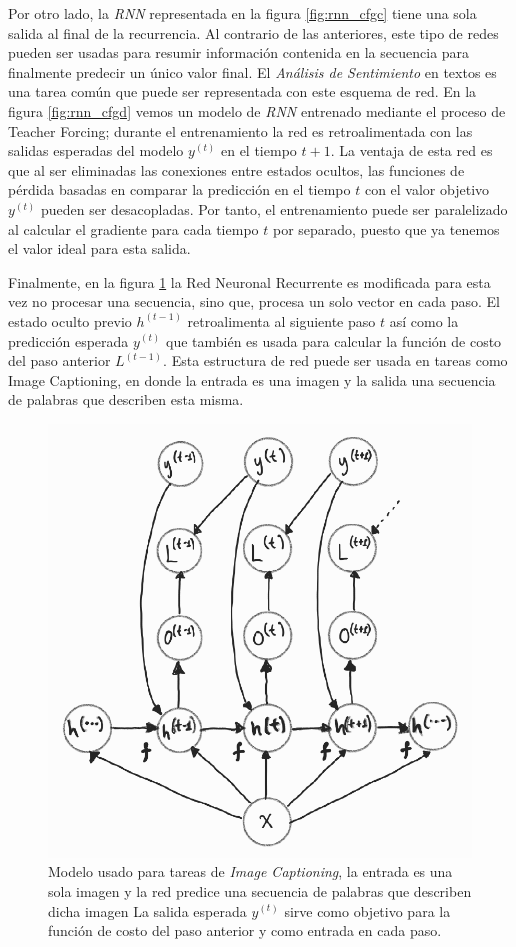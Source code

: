 Por otro lado, la \textit{RNN} representada en la figura \ref{fig:rnn_cfgc} tiene una sola salida al
final de la recurrencia.
Al contrario de las anteriores, este tipo de redes pueden ser usadas para resumir
información contenida en la secuencia para finalmente predecir un único valor final.
El \textit{Análisis de Sentimiento} en textos es una tarea común que puede ser representada con este esquema
de red. En la figura \ref{fig:rnn_cfgd} vemos un modelo de \textit{RNN} entrenado mediante el proceso de
Teacher Forcing; durante el entrenamiento la red es retroalimentada con las salidas
esperadas del modelo $y^{(t)}$ en el tiempo $t+1$. La ventaja de esta red es que al ser eliminadas
las conexiones entre estados ocultos, las funciones de pérdida basadas en comparar la predicción en
el tiempo $t$ con el valor objetivo $y^{(t)}$ pueden ser desacopladas. Por tanto, el entrenamiento
puede ser paralelizado al calcular el gradiente para cada tiempo $t$ por separado, puesto que ya
tenemos el valor ideal para esta salida.

Finalmente, en la figura \ref{fig:rnn_cfge} la Red Neuronal Recurrente es modificada para esta vez
no procesar una secuencia, sino que, procesa un solo vector en cada paso. El estado oculto
previo $h^{(t-1)}$ retroalimenta al siguiente paso $t$ así como la predicción esperada $y^{(t)}$ que
también es usada para calcular la función de costo del paso anterior $L^{(t-1)}$. Esta estructura de
red puede ser usada en tareas como Image Captioning, en donde la entrada es una imagen y la salida
una secuencia de palabras que describen esta misma.

\begin{figure}[!ht]
\centering
\includegraphics[width=.4\textwidth]{Chapters/1. Transformer/Figures/rnn/rnn_cfge.png}
\caption[RNN - Image Captioning]{Modelo usado para tareas de \textit{Image Captioning}, la entrada es una
sola imagen y la red predice una secuencia de palabras que describen dicha imagen La salida esperada
$y^{(t)}$ sirve como objetivo para la función de costo del paso anterior y como entrada en cada paso.}
\label{fig:rnn_cfge}
\end{figure}


